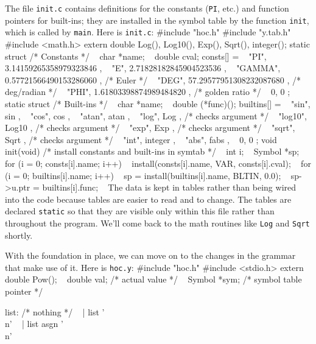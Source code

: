 {The file {\tt init.c} contains definitions for the constants
({\tt PI}, etc.) and function pointers for built-ins; they are
installed in the symbol table by the function {\tt init},
which is called by {\tt main}. Here is {\tt init.c}:
\begincode
#include "hoc.h"
#include "y.tab.h"
#include <math.h>
\medskip
extern double Log(), Log10(), Exp(), Sqrt(), integer();
\medbreak
static struct {        /* Constants */
~   char    *name;
~   double  cval;
} consts[] = {
~   { "PI",    3.14159265358979323846 },
~   { "E",     2.71828182845904523536 },
~   { "GAMMA", 0.57721566490153286060 },  /* Euler */
~   { "DEG",  57.29577951308232087680 },  /* deg/radian */
~   { "PHI",   1.61803398874989484820 },  /* golden ratio */
~   { 0,       0 }
};
\medbreak
static struct {        /* Built-ins */
~   char    *name;
~   double  (*func)();
} builtins[] = {
~   { "sin",    sin     },
~   { "cos",    cos     },
~   { "atan",   atan    },
~   { "log",    Log     },  /* checks argument */
~   { "log10",  Log10   },  /* checks argument */
~   { "exp",    Exp     },  /* checks argument */
~   { "sqrt",   Sqrt    },  /* checks argument */
~   { "int",    integer },
~   { "abs",    fabs    },
~   { 0,        0       }
};
\medbreak
void init(void)  /* install constants and built-ins in symtab */
{
~       int i;
~       Symbol *sp;
\smallbreak
~       for (i = 0; consts[i].name; i++)
~               install(consts[i].name, VAR, consts[i].cval);
~       for (i = 0; builtins[i].name; i++) {
~               sp = install(builtins[i].name, BLTIN, 0.0);
~               sp->u.ptr = builtins[i].func;
~       }
}
\endcode
\noindent
The data is kept in tables rather than being wired into the
code because tables are easier to read and to change. The tables
are declared {\tt static} so that they are visible only within
this file rather than throughout the program. We'll come back
to the math routines like {\tt Log} and {\tt Sqrt} shortly.

With the foundation in place, we can move on to the changes
in the grammar that make use of it. Here is {\tt hoc.y}:
\begincode
#include "hoc.h"
#include <stdio.h>
extern double Pow();
~       double  val;    /* actual value */
~       Symbol *sym;    /* symbol table pointer */
}
list:     /* nothing */
~       | list       '\\n'
~       | list asgn  '\\n'
